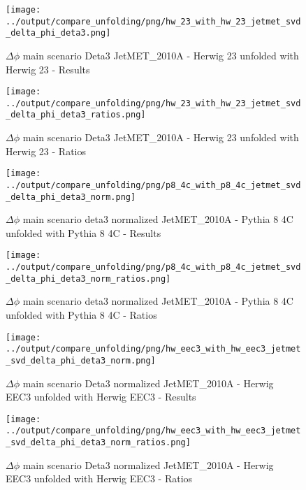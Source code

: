 \documentclass[11pt]{book}
\begin{document}
\begin{figure}[ht]
\centering
\texttt{[image: ../output/compare\_unfolding/png/hw\_23\_with\_hw\_23\_jetmet\_svd\_delta\_phi\_deta3.png]}
\caption{$\Delta\phi$ main scenario Deta3 JetMET\_2010A - Herwig 23 unfolded with Herwig 23 - Results}
\label{hw_23_hw_23_jetmet_svd_delta_phi_deta3_a}
\end{figure}

\begin{figure}[ht]
\centering
\texttt{[image: ../output/compare\_unfolding/png/hw\_23\_with\_hw\_23\_jetmet\_svd\_delta\_phi\_deta3\_ratios.png]}
\caption{$\Delta\phi$ main scenario Deta3 JetMET\_2010A - Herwig 23 unfolded with Herwig 23 - Ratios}
\label{hw_23_hw_23_jetmet_svd_delta_phi_deta3_b}
\end{figure}


\begin{figure}[ht]
\centering
\texttt{[image: ../output/compare\_unfolding/png/p8\_4c\_with\_p8\_4c\_jetmet\_svd\_delta\_phi\_deta3\_norm.png]}
\caption{$\Delta\phi$ main scenario deta3 normalized JetMET\_2010A - Pythia 8 4C unfolded with Pythia 8 4C - Results}
\label{p8_p8_jetmet_svd_delta_phi_deta3_norm_a}
\end{figure}

\begin{figure}[ht]
\centering
\texttt{[image: ../output/compare\_unfolding/png/p8\_4c\_with\_p8\_4c\_jetmet\_svd\_delta\_phi\_deta3\_norm\_ratios.png]}
\caption{$\Delta\phi$ main scenario deta3 normalized JetMET\_2010A - Pythia 8 4C unfolded with Pythia 8 4C - Ratios}
\label{p8_p8_jetmet_svd_delta_phi_deta3_norm_b}
\end{figure}

\begin{figure}[ht]
\centering
\texttt{[image: ../output/compare\_unfolding/png/hw\_eec3\_with\_hw\_eec3\_jetmet\_svd\_delta\_phi\_deta3\_norm.png]}
\caption{$\Delta\phi$ main scenario Deta3 normalized JetMET\_2010A - Herwig EEC3 unfolded with Herwig EEC3 - Results}
\label{hw_eec3_hw_eec3_jetmet_svd_delta_phi_deta3_norm_a}
\end{figure}

\begin{figure}[ht]
\centering
\texttt{[image: ../output/compare\_unfolding/png/hw\_eec3\_with\_hw\_eec3\_jetmet\_svd\_delta\_phi\_deta3\_norm\_ratios.png]}
\caption{$\Delta\phi$ main scenario Deta3 normalized JetMET\_2010A - Herwig EEC3 unfolded with Herwig EEC3 - Ratios}
\label{hw_eec3_hw_eec3_jetmet_svd_delta_phi_deta3_norm_b}
\end{figure}
\end{document}

